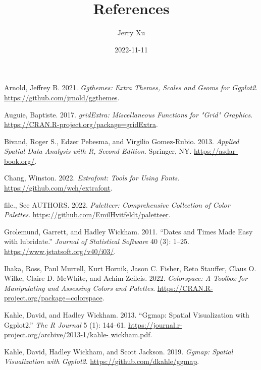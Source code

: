\documentclass[
]{article}
\title{References}
\author{Jerry Xu}
\date{2022-11-11}
\newlength{\cslhangindent}
\newlength{\cslentryspacingunit} %
\newenvironment{CSLReferences}[2] %
 {%
  \setlength{\parindent}{0pt}
  \ifodd #1
  \let\oldpar\par
  \def\par{\hangindent=\cslhangindent\oldpar}
  \fi
  \setlength{\parskip}{#2\cslentryspacingunit}
 }%
 {}
\begin{document}
\maketitle

\hypertarget{refs}{}
\begin{CSLReferences}{1}{0}
\leavevmode{}%
Arnold, Jeffrey B. 2021. \emph{Ggthemes: Extra Themes, Scales and Geoms
for Ggplot2}. \url{https://github.com/jrnold/ggthemes}.

\leavevmode{}%
Auguie, Baptiste. 2017. \emph{gridExtra: Miscellaneous Functions for
"Grid" Graphics}. \url{https://CRAN.R-project.org/package=gridExtra}.

\leavevmode{}%
Bivand, Roger S., Edzer Pebesma, and Virgilio Gomez-Rubio. 2013.
\emph{Applied Spatial Data Analysis with {R}, Second Edition}. Springer,
NY. \url{https://asdar-book.org/}.

\leavevmode{}%
Chang, Winston. 2022. \emph{Extrafont: Tools for Using Fonts}.
\url{https://github.com/wch/extrafont}.

\leavevmode{}%
file., See AUTHORS. 2022. \emph{Paletteer: Comprehensive Collection of
Color Palettes}. \url{https://github.com/EmilHvitfeldt/paletteer}.

\leavevmode{}%
Grolemund, Garrett, and Hadley Wickham. 2011. {``Dates and Times Made
Easy with {lubridate}.''} \emph{Journal of Statistical Software} 40 (3):
1--25. \url{https://www.jstatsoft.org/v40/i03/}.

\leavevmode{}%
Ihaka, Ross, Paul Murrell, Kurt Hornik, Jason C. Fisher, Reto Stauffer,
Claus O. Wilke, Claire D. McWhite, and Achim Zeileis. 2022.
\emph{Colorspace: A Toolbox for Manipulating and Assessing Colors and
Palettes}. \url{https://CRAN.R-project.org/package=colorspace}.

\leavevmode{}%
Kahle, David, and Hadley Wickham. 2013. {``Ggmap: Spatial Visualization
with Ggplot2.''} \emph{The R Journal} 5 (1): 144--61.
\href{https://journal.r-project.org/archive/2013-1/kahle-\%0A\%20\%20\%20\%20wickham.pdf}{https://journal.r-project.org/archive/2013-1/kahle-
wickham.pdf}.

\leavevmode{}%
Kahle, David, Hadley Wickham, and Scott Jackson. 2019. \emph{Ggmap:
Spatial Visualization with Ggplot2}.
\url{https://github.com/dkahle/ggmap}.


\end{CSLReferences}
\end{document}
